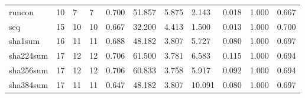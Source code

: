 \begin{longtable}{lp{1.8cm}p{1.8cm}p{1.8cm}p{1.8cm}p{1.8cm}p{1.8cm}p{1.8cm}p{1.8cm}p{1.8cm}p{1.8cm}}
runcon    &                           10 &                  7 &                                 7 &                                      0.700 &                                 51.857 &                                        5.875 &                             2.143 &                                   0.018 &                              1.000 &                                              0.667 \\
seq       &                           15 &                 10 &                                10 &                                      0.667 &                                 32.200 &                                        4.413 &                             1.500 &                                   0.013 &                              1.000 &                                              0.700 \\
sha1sum   &                           16 &                 11 &                                11 &                                      0.688 &                                 48.182 &                                        3.807 &                             5.727 &                                   0.080 &                              1.000 &                                              0.697 \\
sha224sum &                           17 &                 12 &                                12 &                                      0.706 &                                 61.500 &                                        3.781 &                             6.583 &                                   0.115 &                              1.000 &                                              0.694 \\
sha256sum &                           17 &                 12 &                                12 &                                      0.706 &                                 60.833 &                                        3.758 &                             5.917 &                                   0.092 &                              1.000 &                                              0.694 \\
sha384sum &                           17 &                 11 &                                11 &                                      0.647 &                                 48.182 &                                        3.807 &                            10.091 &                                   0.080 &                              1.000 &                                              0.697 \\

\end{longtable}
